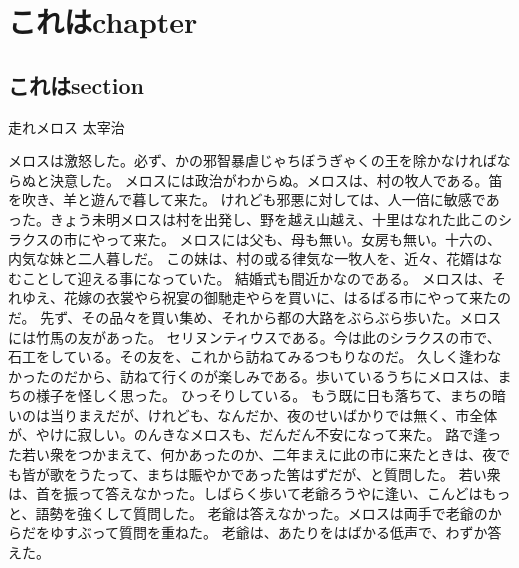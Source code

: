\chapter{これはchapter}
\section{これはsection}
走れメロス
太宰治

メロスは激怒した。必ず、かの邪智暴虐じゃちぼうぎゃくの王を除かなければならぬと決意した。
メロスには政治がわからぬ。メロスは、村の牧人である。笛を吹き、羊と遊んで暮して来た。
けれども邪悪に対しては、人一倍に敏感であった。きょう未明メロスは村を出発し、野を越え山越え、十里はなれた此このシラクスの市にやって来た。
メロスには父も、母も無い。女房も無い。十六の、内気な妹と二人暮しだ。
この妹は、村の或る律気な一牧人を、近々、花婿はなむことして迎える事になっていた。
結婚式も間近かなのである。
メロスは、それゆえ、花嫁の衣裳やら祝宴の御馳走やらを買いに、はるばる市にやって来たのだ。
先ず、その品々を買い集め、それから都の大路をぶらぶら歩いた。メロスには竹馬の友があった。
セリヌンティウスである。今は此のシラクスの市で、石工をしている。その友を、これから訪ねてみるつもりなのだ。
久しく逢わなかったのだから、訪ねて行くのが楽しみである。歩いているうちにメロスは、まちの様子を怪しく思った。
ひっそりしている。
もう既に日も落ちて、まちの暗いのは当りまえだが、けれども、なんだか、夜のせいばかりでは無く、市全体が、やけに寂しい。のんきなメロスも、だんだん不安になって来た。
路で逢った若い衆をつかまえて、何かあったのか、二年まえに此の市に来たときは、夜でも皆が歌をうたって、まちは賑やかであった筈はずだが、と質問した。
若い衆は、首を振って答えなかった。しばらく歩いて老爺ろうやに逢い、こんどはもっと、語勢を強くして質問した。
老爺は答えなかった。メロスは両手で老爺のからだをゆすぶって質問を重ねた。
老爺は、あたりをはばかる低声で、わずか答えた。


